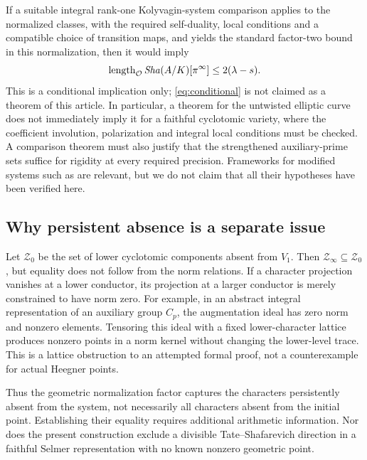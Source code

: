 \documentclass[11pt]{article}
\theoremstyle{definition}\newtheorem{definition}[theorem]{Definition}
\theoremstyle{remark}\newtheorem{remark}[theorem]{Remark}
\newcommand{\OO}{\mathcal O}\newcommand{\Tr}{\operatorname{Tr}}
\begin{document}
If a suitable integral rank-one Kolyvagin-system comparison applies to the normalized classes, with the required self-duality, local conditions and a compatible choice of transition maps, and yields the standard factor-two bound in this normalization, then it would imply
\begin{equation}\label{eq:conditional}
 \operatorname{length}_{\OO}\ShaG(A/K)[\pi^\infty]\le 2(\lambda-s).
\end{equation}
This is a conditional implication only; \eqref{eq:conditional} is not claimed as a theorem of this article. In particular, a theorem for the untwisted elliptic curve does not immediately imply it for a faithful cyclotomic variety, where the coefficient involution, polarization and integral local conditions must be checked. A comparison theorem must also justify that the strengthened auxiliary-prime sets suffice for rigidity at every required precision. Frameworks for modified systems such as \cite{MZ} are relevant, but we do not claim that all their hypotheses have been verified here.

\subsection{Why persistent absence is a separate issue}
Let $\mathcal Z_0$ be the set of lower cyclotomic components absent from $V_1$. Then $\mathcal Z_\infty\subseteq\mathcal Z_0$, but equality does not follow from the norm relations. If a character projection vanishes at a lower conductor, its projection at a larger conductor is merely constrained to have norm zero. For example, in an abstract integral representation of an auxiliary group $C_p$, the augmentation ideal has zero norm and nonzero elements. Tensoring this ideal with a fixed lower-character lattice produces nonzero points in a norm kernel without changing the lower-level trace. This is a lattice obstruction to an attempted formal proof, not a counterexample for actual Heegner points.

Thus the geometric normalization factor captures the characters persistently absent from the system, not necessarily all characters absent from the initial point. Establishing their equality requires additional arithmetic information. Nor does the present construction exclude a divisible Tate--Shafarevich direction in a faithful Selmer representation with no known nonzero geometric point.
\end{document}
